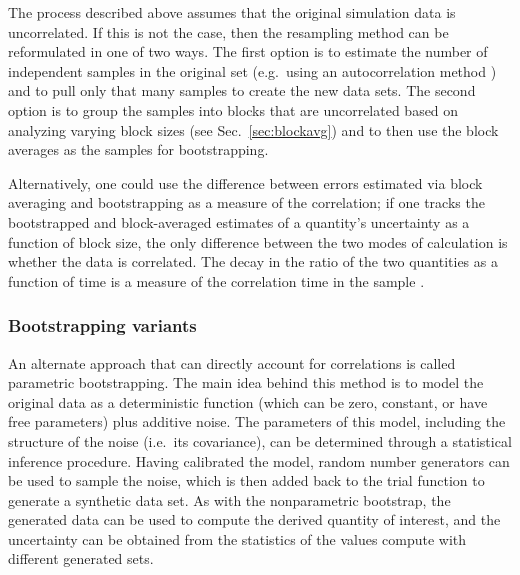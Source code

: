 
The process described above assumes that the original simulation data is uncorrelated.  If this is not the case, then the resampling method can be reformulated in one of two ways.  The first option is to estimate the number of independent samples in the original set (e.g.\ using an autocorrelation method \cite{Chodera-2016,Lyman2007a}) and to pull only that many samples to create the new data sets.  The second option is to group the samples into blocks that are uncorrelated based on analyzing varying block sizes (see Sec.~\ref{sec:blockavg}) and to then use the block averages as the samples for bootstrapping.

Alternatively, one could use the difference between errors estimated via block averaging and bootstrapping as a measure of the correlation; if one tracks the bootstrapped and block-averaged estimates of a quantity's uncertainty as a function of block size, the only difference between the two modes of calculation is whether the data is correlated.  The decay in the ratio of the two quantities as a function of time is a measure of the correlation time in the sample \cite{Romo2011}.

\subsubsection{Bootstrapping variants}

An alternate approach that can directly account for correlations is called parametric bootstrapping.  The main idea behind this method is to model the original data as a deterministic function (which can be zero, constant, or have free parameters) plus additive noise.  The parameters of this model, including the structure of the noise (i.e.\ its covariance), can be determined through a statistical inference procedure.  Having calibrated the model, random number generators can be used to sample the noise, which is then added back to the trial function to generate a synthetic data set.   As with the nonparametric bootstrap, the generated data can be used to compute the derived quantity of interest, and the uncertainty can be obtained from the statistics of the values compute with different generated sets.

